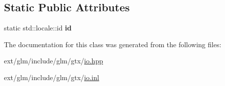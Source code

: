 \subsection*{Static Public Attributes}
\begin{DoxyCompactItemize}
\item 
\hypertarget{classglm_1_1io_1_1format__punct_a763f60aeaecec9290917ed1d83b79838}{static std\-::locale\-::id {\bfseries id}}\label{classglm_1_1io_1_1format__punct_a763f60aeaecec9290917ed1d83b79838}

\end{DoxyCompactItemize}


The documentation for this class was generated from the following files\-:\begin{DoxyCompactItemize}
\item 
ext/glm/include/glm/gtx/\hyperlink{io_8hpp}{io.\-hpp}\item 
ext/glm/include/glm/gtx/\hyperlink{io_8inl}{io.\-inl}\end{DoxyCompactItemize}
